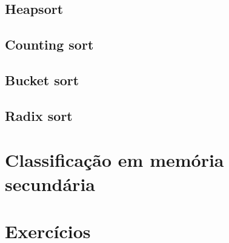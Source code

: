 \subsection{Heapsort}

\subsection{Counting sort}

\subsection{Bucket sort}

\subsection{Radix sort}

\section{Classificação em memória secundária}

\section{Exercícios}

